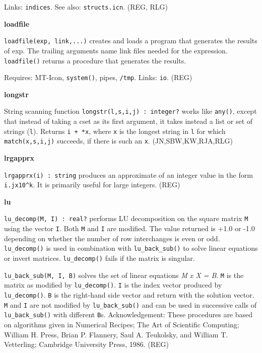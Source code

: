 Links: \texttt{indices}. See also: \texttt{structs.icn}. (REG, RLG)

{\sffamily\bfseries
loadfile}

\texttt{loadfile(exp, link,...)} creates and loads a program that
generates the results of exp. The trailing arguments name link files
needed for the expression. \texttt{loadfile()} returns a procedure that
generates the results.

Requires: MT-Icon, \texttt{system()}, pipes, \texttt{/tmp}. Links:
\texttt{io}. (REG)

{\sffamily\bfseries
longstr}

String scanning function \texttt{longstr(l,s,i,j) : integer?} works like
\texttt{any()}, except that instead of taking a cset as its first
argument, it takes instead a list or set of strings (\texttt{l}).
Returns \texttt{i + *x}, where \texttt{x} is the longest string in \texttt{l} for which \texttt{match(x,s,i,j)}
succeeds, if there is such an \texttt{x}. (JN,SBW,KW,RJA,RLG)

{\sffamily\bfseries
lrgapprx}

\texttt{lrgapprx(i) : string} produces an approximate of an integer
value in the form \texttt{i.jx10\^{}k}. It is primarily useful for
large integers. (REG)

{\sffamily\bfseries
lu}

\texttt{lu\_decomp(M, I) : real?} performs LU
decomposition on the square matrix \texttt{M} using the vector
\texttt{I}. Both \texttt{M} and \texttt{I} are modified. The value
returned is +1.0 or -1.0 depending on whether the number of row
interchanges is even or odd. \texttt{lu\_decomp()} is used in
combination with \texttt{lu\_back\_sub()} to solve linear equations or
invert matrices. \texttt{lu\_decomp()} fails if the matrix is singular.

\texttt{lu\_back\_sub(M, I, B)} solves the set of linear equations
\textit{M x X = B}. \texttt{M} is the matrix as modified by
\texttt{lu\_decomp()}. \texttt{I} is the index vector produced by
\texttt{lu\_decomp()}. \texttt{B} is the right-hand side vector and
return with the solution vector. \texttt{M} and \texttt{I} are not
modified by \texttt{lu\_back\_sub()} and can be used in successive
calls of \texttt{lu\_back\_sub()} with different \texttt{B}s.
Acknowledgement: These procedures are based on algorithms given in
{\textquotedbl}Numerical Recipes; The Art of Scientific
Computing{\textquotedbl}; William H. Press, Brian P. Flannery, Saul A.
Teukolsky, and William T. Vetterling; Cambridge University Press, 1986.
(REG)

